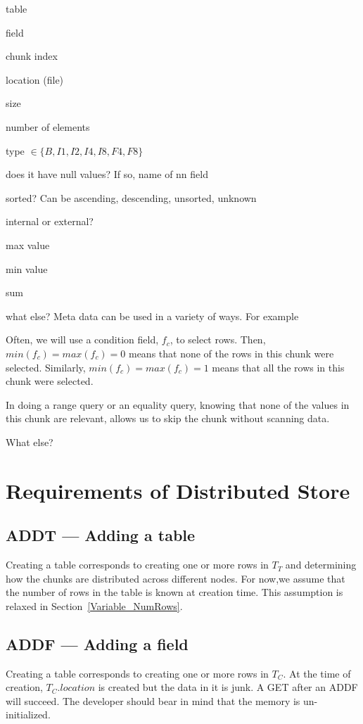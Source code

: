 \be
\item table 
\item field 
\item chunk index
\item location (file)
\item size
\item number of elements
\item type \( \in \{B, I1, I2, I4, I8, F4, F8\}\)
\item does it have null values? If so, name of nn field
\item sorted? Can be ascending, descending, unsorted, unknown
\item internal or external?
\item max value
\item min value
\item sum 
\item what else? 
\ee
Meta data can be used in a variety of ways. For example
\be
\item Often, we will use a condition field, \(f_c\),  to select rows.
Then, \(min(f_c) = max(f_c) = 0\) means that none of the rows in this
chunk were selected. 
Similarly, \(min(f_c) = max(f_c) = 1\) means that all the rows in this
chunk were selected. 
\item In doing a range query or an equality query, knowing that none of
the values in this chunk are relevant, allows us to skip the chunk
without scanning data.
\item What else?
\ee

\section{Requirements of Distributed Store}

\subsection{ADDT --- Adding a table}
\label{ADDT}

Creating a table corresponds to creating one or more rows in \(T_T\) and determining
how the chunks are distributed across different nodes. For now,we assume
that the number of rows in the table is known at creation time. This
assumption is relaxed in Section~\ref{Variable_NumRows}.

\subsection{ADDF --- Adding a field}
\label{ADDF}
Creating a table corresponds to creating one or more rows in \(T_C\).
At the time of creation, \(T_C.location\) is created but the
data in it is junk. A GET after an ADDF will succeed. The developer
should bear in mind that the memory is un-initialized.


